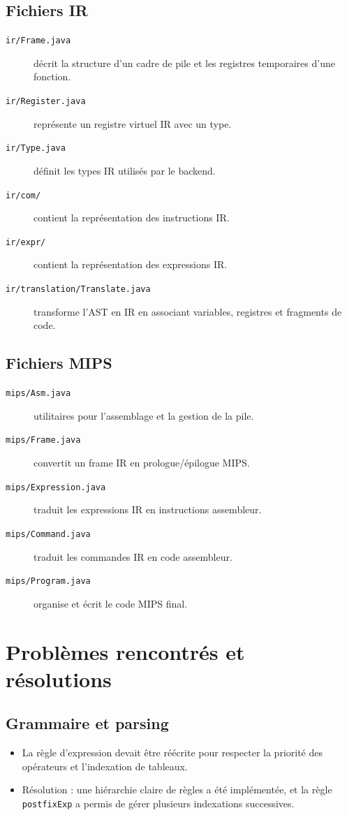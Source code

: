 \documentclass[a4paper,11pt]{article}
\begin{document}
\subsection{Fichiers IR}
\begin{description}
  \item[\texttt{ir/Frame.java}] décrit la structure d'un cadre de pile et les registres temporaires d'une fonction.
  \item[\texttt{ir/Register.java}] représente un registre virtuel IR avec un type.
  \item[\texttt{ir/Type.java}] définit les types IR utilisés par le backend.
  \item[\texttt{ir/com/}] contient la représentation des instructions IR.
  \item[\texttt{ir/expr/}] contient la représentation des expressions IR.
  \item[\texttt{ir/translation/Translate.java}] transforme l'AST en IR en associant variables, registres et fragments de code.
\end{description}

\subsection{Fichiers MIPS}
\begin{description}
  \item[\texttt{mips/Asm.java}] utilitaires pour l'assemblage et la gestion de la pile.
  \item[\texttt{mips/Frame.java}] convertit un frame IR en prologue/épilogue MIPS.
  \item[\texttt{mips/Expression.java}] traduit les expressions IR en instructions assembleur.
  \item[\texttt{mips/Command.java}] traduit les commandes IR en code assembleur.
  \item[\texttt{mips/Program.java}] organise et écrit le code MIPS final.
\end{description}

\section{Problèmes rencontrés et résolutions}

\subsection{Grammaire et parsing}
\begin{itemize}
  \item La règle d'expression devait être réécrite pour respecter la priorité des opérateurs et l'indexation de tableaux.
  \item Résolution : une hiérarchie claire de règles a été implémentée, et la règle \texttt{postfixExp} a permis de gérer plusieurs indexations successives.
\end{itemize}
\end{document}
